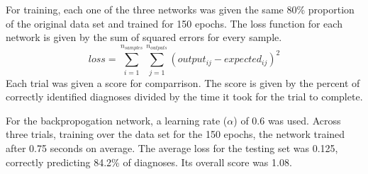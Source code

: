 \documentclass[12pt]{article}
\begin{document}
        For training, each one of the three networks was given the same 80\% proportion of the original data set and trained for 150 epochs.
        The loss function for each network is given by the sum of squared errors for every sample.
        \begin{equation}\label{sumSquaredErrs}
            loss = \sum_{i=1}^{n_{samples}} \sum_{j=1}^{n_{outputs}} (output_{ij} - expected_{ij})^2
        \end{equation}
        Each trial was given a score for comparrison.  The score is given by the percent of correctly identified diagnoses divided by the time it took for the
        trial to complete.

        For the backpropogation network, a learning rate (\(\alpha\)) of 0.6 was used.  Across three trials, training over the data set for
        the 150 epochs, the network trained after 0.75 seconds on average.  The average loss for the testing set was 0.125, correctly predicting 84.2\% of diagnoses.
        Its overall score was 1.08.
\end{document}
